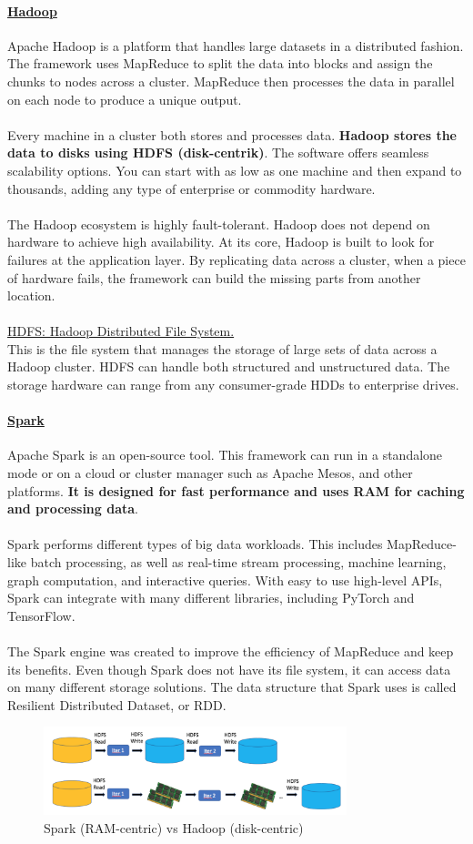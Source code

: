 \documentclass[10pt,a4paper]{article}
\newcommand{\nline}{\\~\\}
\begin{document}
\paragraph{\uline{Hadoop}}
Apache Hadoop is a platform that handles large datasets in a distributed fashion. The framework uses MapReduce to split the data into blocks and assign the chunks to nodes across a cluster. MapReduce then processes the data in parallel on each node to produce a unique output. 
\nline
Every machine in a cluster both stores and processes data. \textbf{Hadoop stores the data to disks using HDFS (disk-centrik)}. The software offers seamless scalability options. You can start with as low as one machine and then expand to thousands, adding any type of enterprise or commodity hardware.
\nline
The Hadoop ecosystem is highly fault-tolerant. Hadoop does not depend on hardware to achieve high availability. At its core, Hadoop is built to look for failures at the application layer. By replicating data across a cluster, when a piece of hardware fails, the framework can build the missing parts from another location.
\nline
\uline{HDFS: Hadoop Distributed File System.} \\
This is the file system that manages the storage of large sets of data across a Hadoop cluster. HDFS can handle both structured and unstructured data. The storage hardware can range from any consumer-grade HDDs to enterprise drives.

\paragraph{\uline{Spark}}
Apache Spark is an open-source tool. This framework can run in a standalone mode or on a cloud or cluster manager such as Apache Mesos, and other platforms. \textbf{It is designed for fast performance and uses RAM for caching and processing data}.
\nline
Spark performs different types of big data workloads. This includes MapReduce-like batch processing, as well as real-time stream processing, machine learning, graph computation, and interactive queries. With easy to use high-level APIs, Spark can integrate with many different libraries, including PyTorch and TensorFlow.
\nline
The Spark engine was created to improve the efficiency of MapReduce and keep its benefits. Even though Spark does not have its file system, it can access data on many different storage solutions. The data structure that Spark uses is called Resilient Distributed Dataset, or RDD.
    \begin{figure}[ht!]
 \hfill \includegraphics[width=250pt]{images/spark-vs-hadoop}\hspace*{\fill}
 \caption{Spark (RAM-centric) vs Hadoop (disk-centric)}
 \end{figure} 
\end{document}
